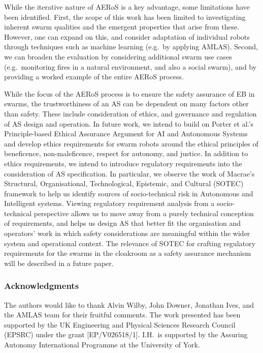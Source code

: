 \documentclass[runningheads]{llncs}
\begin{document}
While the iterative nature of AERoS is a key advantage, some limitations have been identified. 
First, the scope of this work has been limited to investigating inherent swarm qualities and the emergent properties that arise from these. 
However, one can expand on this, and consider adaptation of individual robots through techniques such as machine learning (e.g.\ by applying AMLAS).
Second, we can broaden the evaluation by considering additional swarm use cases (e.g.\ monitoring fires in a natural environment, and also a social swarm), and by providing a worked example of the entire AERoS process.

While the focus of the AERoS process is to ensure the safety assurance of EB in swarms, the trustworthiness of an AS can be dependent on many factors other than safety. These include consideration of ethics, and governance and regulation of AS design and operation. 
In future work, we intend to build on Porter et al.’s \cite{Porter2022} Principle-based Ethical Assurance Argument for AI and Autonomous Systems and develop ethics requirements for swarm robots around the ethical principles of beneficence, non-maleficence, respect for autonomy, and justice. 
In addition to ethics requirements, we intend to introduce regulatory requirements into the consideration of AS specification. In particular, we observe the work of Macrae’s~\cite{macrae2021learning} Structural, Organisational, Technological, Epistemic, and Cultural (SOTEC) framework to help us identify sources of socio-technical risk in Autonomous and Intelligent systems. Viewing regulatory requirement analysis from a socio-technical perspective allows us to move away from a purely technical conception of requirements, and helps us design AS that better fit the organisation and operators’ work in which safety considerations are meaningful within the wider system and operational context. The relevance of SOTEC for crafting regulatory requirements for the swarms in the cloakroom as a safety assurance mechanism will be described in a future paper. 

\subsubsection*{Acknowledgments}
The authors would like to thank Alvin Wilby, John Downer, Jonathan Ives, and the AMLAS team for their fruitful comments. The work presented has been supported by the UK Engineering and Physical Sciences Research Council (EPSRC) under the grant [EP/V026518/1]. 
I.H.\ is supported by the Assuring Autonomy International Programme at the University of York.
%
%
%

%
\end{document}
